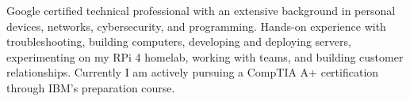 
\begin{cvparagraph}
Google certified technical professional with an extensive background in personal devices, networks, cybersecurity, and programming. Hands-on experience with troubleshooting, building computers, developing and deploying servers, experimenting on my RPi 4 homelab, working with teams, and building customer relationships. Currently I am actively pursuing a CompTIA A+ certification through IBM's preparation course.


\end{cvparagraph}
